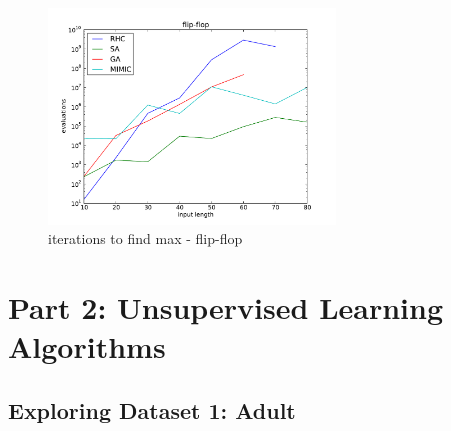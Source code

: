 \documentclass{sig-alternate}
\begin{document}
\begin{figure}[!htbp]
    \centering
    \includegraphics[width=3in]{part1.2/flip-flop-max.pdf}
    \caption{iterations to find max - flip-flop\label{max-flip-flop}}
\end{figure} 






\clearpage

\section{Part 2: Unsupervised Learning Algorithms}


\subsection{Exploring Dataset 1: Adult}
\end{document}
